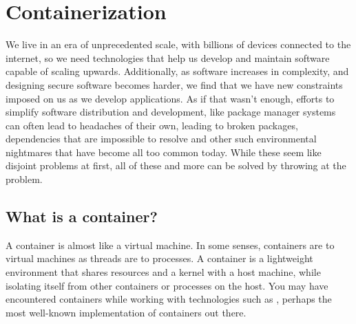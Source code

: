 \section{Containerization}
We live in an era of unprecedented scale, with billions of devices
connected to the internet, so we need technologies that help us develop and
maintain software capable of scaling upwards. Additionally, as software increases
in complexity, and designing secure software becomes harder, we find that we
have new constraints imposed on us as we develop applications. As if that wasn't
enough, efforts to simplify software distribution and development, like package
manager systems can often lead to headaches of their own, leading to broken
packages, dependencies that are impossible to resolve and other such
environmental nightmares that have become all too common today. While these seem
like disjoint problems at first, all of these and more can be solved by throwing
 at the problem.

\subsection{What is a container?}
A container is almost like a virtual machine.
In some senses, containers are to virtual machines as threads are to processes.
A container is a lightweight environment that shares resources and a kernel with
a host machine, while isolating itself from other containers or processes on the
host. You may have encountered containers while working with technologies such
as , perhaps the most well-known implementation of containers
out there.

